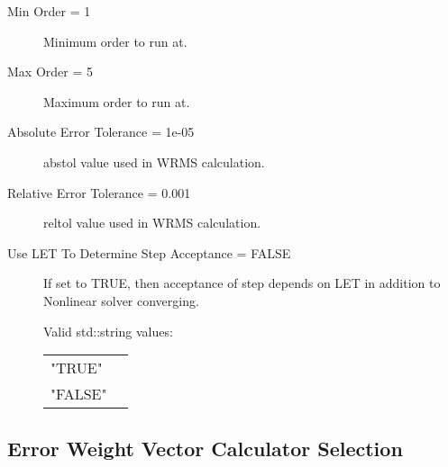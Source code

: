 \begin{list}{}
\begin{description}
      \item[Min Order = 1] 
Minimum order to run at.
      \item[Max Order = 5] 
Maximum order to run at.
      \item[Absolute Error Tolerance = 1e-05] 
abstol value used in WRMS calculation.
      \item[Relative Error Tolerance = 0.001] 
reltol value used in WRMS calculation.
      \item[Use LET To Determine Step Acceptance = FALSE] 
If set to TRUE, then acceptance of step depends on LET in addition to Nonlinear solver converging.

  Valid std::string values:

      \begin{tabular}{lp{}}
      "TRUE" & \\ 
      "FALSE" & \\ 
      \end{tabular}
\end{description}

\end{list}

\subsection{Error Weight Vector Calculator Selection}
\label{sec:Error Weight Vector Calculator Selection}

